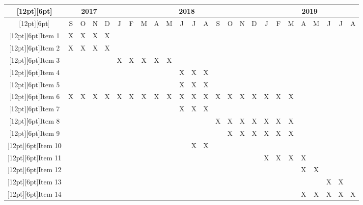 \documentclass[
	12pt,				%
	oneside,			%
	a4paper,			%
	brazil,			    %
	french,				%
	spanish,			%
	english,			%
	]{abntex2}
\begin{document}
\begin{landscape}
	\centering
\begin{adjustbox}{width=\textheight, totalheight=\textwidth,keepaspectratio}
\begin{tabular}{|c|c|c|c|c|c|c|c|c|c|c|c|c|c|c|c|c|c|c|c|c|c|c|c|c|}
	\hline
	\raisebox{0pt}[12pt][6pt]  & \multicolumn{4}{|c|}{2017} & \multicolumn{12}{|c|}{2018} & \multicolumn{8}{|c|}{2019} \\
	\hline
	\raisebox{0pt}[12pt][6pt]	        &S&O&N&D&J&F&M&A&M&J&J&A&S&O&N&D&J&F&M&A&M&J&J&A\\
	\hline
	\raisebox{0pt}[12pt][6pt]{Item 1}	&X&X&X&X& & & & & & & & & & & & & & & & & & & & \\
	\hline
	\raisebox{0pt}[12pt][6pt]{Item 2}   &X&X&X&X& & & & & & & & & & & & & & & & & & & & \\
	\hline
	\raisebox{0pt}[12pt][6pt]{Item 3}	& & & & &X&X&X&X&X& & & & & & & & & & & & & & & \\
	\hline
	\raisebox{0pt}[12pt][6pt]{Item 4}   & & & & & & & & & &X&X&X& & & & & & & & & & & & \\
	\hline
	\raisebox{0pt}[12pt][6pt]{Item 5}   & & & & & & & & & &X&X&X& & & & & & & & & & & & \\
	\hline
	\raisebox{0pt}[12pt][6pt]{Item 6}	&X&X&X&X&X&X&X&X&X&X&X&X&X&X&X&X&X&X&X& & & & & \\
	\hline
	\raisebox{0pt}[12pt][6pt]{Item 7}	& & & & & & & & & &X&X&X& & & & & & & & & & & & \\
	\hline
	\raisebox{0pt}[12pt][6pt]{Item 8}   & & & & & & & & & & & & &X&X&X&X&X&X&X& & & & & \\
	\hline
	\raisebox{0pt}[12pt][6pt]{Item 9}   & & & & & & & & & & & & & &X&X&X&X&X&X& & & & & \\
	\hline
	\raisebox{0pt}[12pt][6pt]{Item 10}  & & & & & & & & & & &X&X& & & & & & & & & & & & \\
	\hline
	\raisebox{0pt}[12pt][6pt]{Item 11}	& & & & & & & & & & & & & & & & &X&X&X&X& & & & \\
	\hline
	\raisebox{0pt}[12pt][6pt]{Item 12}  & & & & & & & & & & & & & & & & & & & &X&X& & & \\
	\hline
	\raisebox{0pt}[12pt][6pt]{Item 13}  & & & & & & & & & & & & & & & & & & & & & &X&X& \\
	\hline
	\raisebox{0pt}[12pt][6pt]{Item 14}  & & & & & & & & & & & & & & & & & & & &X&X&X&X&X\\
	\hline
\end{tabular}
\end{adjustbox}
\end{landscape}
\end{document}
